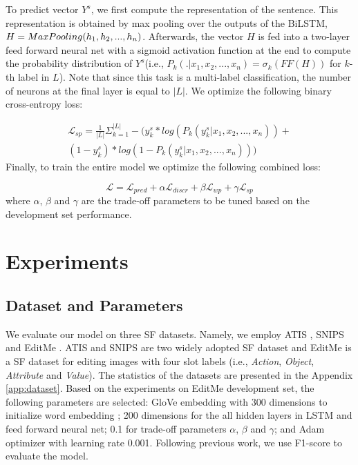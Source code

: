 \documentclass[11pt,a4paper]{article}
\begin{document}
To predict vector $Y^s$, we first compute the representation of the sentence. This representation is obtained by max pooling over the outputs of the BiLSTM, $H=Max\-Pooling(h_1,h_2,...,h_n)$. Afterwards, the vector $H$ is fed into a two-layer feed forward neural net with a sigmoid activation function at the end to compute the probability distribution of $Y^s$(i.e., $P_k(.|x_1,x_2,...,x_n) = \sigma_k(FF(H))$ for $k$-th label in $L$). Note that since this task is a multi-label classification, the number of neurons at the final layer is equal to $|L|$. We optimize the following binary cross-entropy loss:

\begin{equation}
\begin{split}
    \mathcal{L}_{sp} = \frac{1}{|L|} \Sigma_{k=1}^{|L|} -(y^s_k * log(P_k(y^s_k|x_1,x_2,...,x_n)) + \\ (1-y^s_k)*log(1-P_k(y^s_k|x_1,x_2,...,x_n)))
\end{split}
\end{equation}
Finally, to train the entire model we optimize the following combined loss:

\begin{equation}
    \mathcal{L} = \mathcal{L}_{pred}+\alpha \mathcal{L}_{discr} + \beta \mathcal{L}_{wp} + \gamma \mathcal{L}_{sp}
\end{equation}
where $\alpha$, $\beta$ and $\gamma$ are the trade-off parameters to be tuned based on the development set performance.

















\section{Experiments}

\subsection{Dataset and Parameters}
We evaluate our model on three SF datasets. Namely, we employ ATIS \cite{hemphill:90}, SNIPS \cite{coucke:18} and EditMe \cite{manuvinakurike2018edit}. ATIS and SNIPS are two widely adopted SF dataset and EditMe is a SF dataset for editing images with four slot labels (i.e., \textit{Action}, \textit{Object}, \textit{Attribute} and \textit{Value}). The statistics of the datasets are presented in the Appendix \ref{app:dataset}. Based on the experiments on EditMe development set, the following parameters are selected: GloVe embedding with 300 dimensions to initialize word embedding
; 200 dimensions for the all hidden layers in LSTM and feed forward neural net; 0.1 for trade-off parameters $\alpha$, $\beta$ and $\gamma$; 
and Adam optimizer with learning rate 0.001. Following previous work, we use F1-score to evaluate the model.
\end{document}

